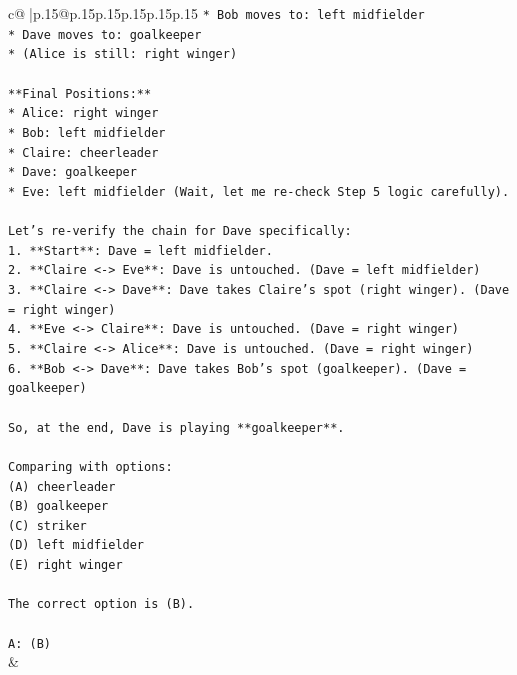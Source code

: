 \documentclass{article}
\begin{document}
{\begin{supertabular}{c@{$\;$}|p{.15\linewidth}@{}p{.15\linewidth}p{.15\linewidth}p{.15\linewidth}p{.15\linewidth}p{.15\linewidth}}
{{{\texttt{*   Bob moves to: left midfielder} \\
\texttt{*   Dave moves to: goalkeeper} \\
\texttt{*   (Alice is still: right winger)} \\
\\ 
\texttt{**Final Positions:**} \\
\texttt{*   Alice: right winger} \\
\texttt{*   Bob: left midfielder} \\
\texttt{*   Claire: cheerleader} \\
\texttt{*   Dave: goalkeeper} \\
\texttt{*   Eve: left midfielder (Wait, let me re{-}check Step 5 logic carefully).} \\
\\ 
\texttt{Let's re{-}verify the chain for Dave specifically:} \\
\texttt{1.  **Start**: Dave = left midfielder.} \\
\texttt{2.  **Claire <{-}> Eve**: Dave is untouched. (Dave = left midfielder)} \\
\texttt{3.  **Claire <{-}> Dave**: Dave takes Claire's spot (right winger). (Dave = right winger)} \\
\texttt{4.  **Eve <{-}> Claire**: Dave is untouched. (Dave = right winger)} \\
\texttt{5.  **Claire <{-}> Alice**: Dave is untouched. (Dave = right winger)} \\
\texttt{6.  **Bob <{-}> Dave**: Dave takes Bob's spot (goalkeeper). (Dave = goalkeeper)} \\
\\ 
\texttt{So, at the end, Dave is playing **goalkeeper**.} \\
\\ 
\texttt{Comparing with options:} \\
\texttt{(A) cheerleader} \\
\texttt{(B) goalkeeper} \\
\texttt{(C) striker} \\
\texttt{(D) left midfielder} \\
\texttt{(E) right winger} \\
\\ 
\texttt{The correct option is (B).} \\
\\ 
\texttt{A: (B)} \\
            }
        }
    }
    & \\ \\


\end{supertabular}}
\end{document}
